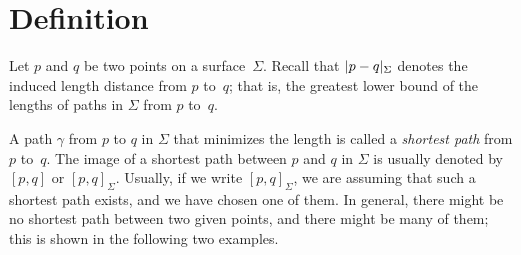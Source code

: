 \section{Definition}

Let $p$ and $q$ be two points on a surface~$\Sigma$.
Recall that $\dist{p}{q}\Sigma$ denotes the induced length distance from $p$ to~$q$;
that is, the greatest lower bound of the lengths of paths in $\Sigma$ from $p$ to~$q$.


A path $\gamma$ from $p$ to $q$ in $\Sigma$ that minimizes the length is called a \emph{shortest path} from $p$ to~$q$.
The image of a shortest path between $p$ and $q$ in $\Sigma$ is usually denoted by $[p,q]$ or $[p,q]_\Sigma$.
Usually, if we write $[p,q]_\Sigma$, we are assuming that such a shortest path exists, and we have chosen one of them.
In general, there might be no shortest path between two given points, and there might be many of them;
this is shown in the following two examples.


